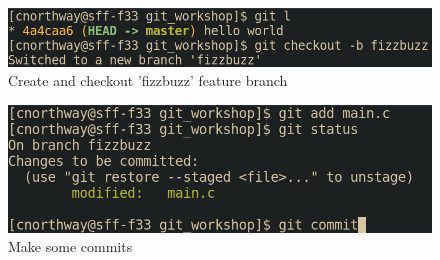\documentclass{beamer} \usetheme{Madrid}
\begin{document}
\begin{frame}
    \begin{figure}
        \includegraphics[height=\textwidth-2cm]{ex_imgs/1.png}
        \caption{Create and checkout 'fizzbuzz' feature branch}
    \end{figure}
\end{frame}
\begin{frame}
    \begin{figure}
        \includegraphics[height=\textwidth-2cm]{ex_imgs/2.png}
        \caption{Make some commits}
    \end{figure}
\end{frame}
\end{document}
